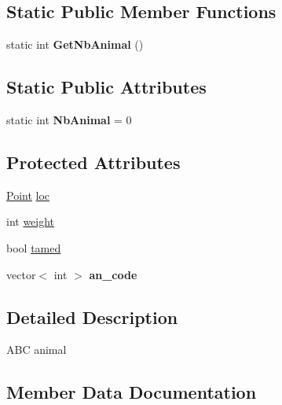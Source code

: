\subsection*{Static Public Member Functions}
\begin{DoxyCompactItemize}
\item 
static int {\bfseries Get\+Nb\+Animal} ()\hypertarget{classAnimal_aea7f0287e8ab52c497acf001b141c54d}{}\label{classAnimal_aea7f0287e8ab52c497acf001b141c54d}

\end{DoxyCompactItemize}
\subsection*{Static Public Attributes}
\begin{DoxyCompactItemize}
\item 
static int {\bfseries Nb\+Animal} = 0\hypertarget{classAnimal_a828b89505d3cf5fee0e3042332a81e6e}{}\label{classAnimal_a828b89505d3cf5fee0e3042332a81e6e}

\end{DoxyCompactItemize}
\subsection*{Protected Attributes}
\begin{DoxyCompactItemize}
\item 
\hyperlink{classPoint}{Point} \hyperlink{classAnimal_a7f26dd7aa22ec6c003e0d564fb27baa3}{loc}
\item 
int \hyperlink{classAnimal_a9a3b22f243f7109c57f36b3c660feb6e}{weight}
\item 
bool \hyperlink{classAnimal_aa7863df489c833b29c8697d4c5a94167}{tamed}
\item 
vector$<$ int $>$ {\bfseries an\+\_\+code}\hypertarget{classAnimal_ae7c09ba8ebe4c92371489e3bc7841d47}{}\label{classAnimal_ae7c09ba8ebe4c92371489e3bc7841d47}

\end{DoxyCompactItemize}


\subsection{Detailed Description}
A\+BC animal 

\subsection{Member Data Documentation}
